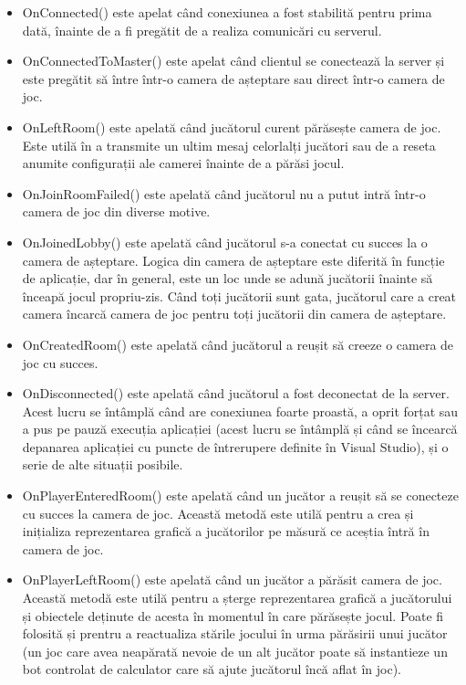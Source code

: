 \documentclass[12pt, a4paper]{article}
\begin{document}
	\begin{itemize}
		\item OnConnected() este apelat când conexiunea a fost stabilită pentru prima dată, înainte de a fi pregătit de a realiza comunicări cu serverul.
		\item OnConnectedToMaster() este apelat când clientul se conectează la server și este pregătit să între într-o camera de așteptare sau direct într-o camera de joc.
		\item OnLeftRoom() este apelată când jucătorul curent părăsește camera de joc. Este utilă în a transmite un ultim mesaj celorlalți jucători sau de a reseta anumite configurații ale camerei înainte de a părăsi jocul.
		\item OnJoinRoomFailed() este apelată când jucătorul nu a putut intră într-o camera de joc din diverse motive.
		\item OnJoinedLobby() este apelată când jucătorul s-a conectat cu succes la o camera de așteptare. Logica din camera de așteptare este diferită în funcție de aplicație, dar în general, este un loc unde se adună jucătorii înainte să înceapă jocul propriu-zis. Când toți jucătorii sunt gata, jucătorul care a creat camera încarcă camera de joc pentru toți jucătorii din camera de așteptare.
		\item OnCreatedRoom() este apelată când jucătorul a reușit să creeze o camera de joc cu succes.
		\item OnDisconnected() este apelată când jucătorul a fost deconectat de la server. Acest lucru se întâmplă când are conexiunea foarte proastă, a oprit forțat sau a pus pe pauză execuția aplicației (acest lucru se întâmplă și când se încearcă depanarea aplicației cu puncte de întrerupere definite în Visual Studio), și o serie de alte situații posibile.
		\item OnPlayerEnteredRoom() este apelată când un jucător a reușit să se conecteze cu succes la camera de joc. Această metodă este utilă pentru a crea și inițializa reprezentarea grafică a jucătorilor pe măsură ce aceștia întră în camera de joc.
		\item OnPlayerLeftRoom() este apelată când un jucător a părăsit camera de joc. Această metodă este utilă pentru a șterge reprezentarea grafică a jucătorului și obiectele deținute de acesta în momentul în care părăsește jocul. Poate fi folosită și prentru a reactualiza stările jocului în urma părăsirii unui jucător (un joc care avea neapărată nevoie de un alt jucător poate să instantieze un bot controlat de calculator care să ajute jucătorul încă aflat în joc).
	\end{itemize}
	
\end{document}
